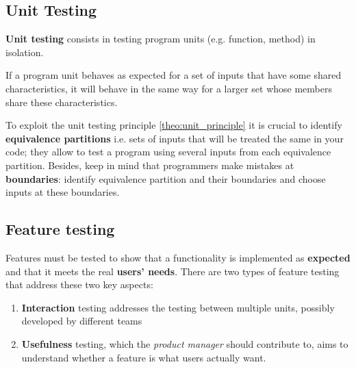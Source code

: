\subsection{Unit Testing}
\textbf{Unit testing} consists in testing program units (e.g. function, method) in isolation.

\begin{theorem}
   \label{theo:unit_principle}
If a program unit behaves as expected for a set of inputs that have some shared
characteristics, it will behave in the same way for a larger set whose members share
these characteristics.

\end{theorem}

To exploit the unit testing principle \ref{theo:unit_principle} it is crucial to
identify \textbf{equivalence partitions} i.e. sets of inputs that will be treated the same in your code;
they allow to test a program using several inputs from each equivalence partition.
Besides, keep in mind that programmers make mistakes at \textbf{boundaries}: 
identify equivalence partition and their boundaries and choose inputs at these boundaries.

\subsection{Feature testing}
Features must be tested to show that a functionality is implemented as \textbf{expected} and that it meets the real \textbf{users' needs}.
There are two types of feature testing that address these two key aspects:
\begin{enumerate}
   \item \textbf{Interaction} testing addresses the testing between multiple units, possibly developed by different teams
   \item \textbf{Usefulness} testing, which the \textit{product manager} should contribute to, aims to understand whether a feature is what users actually want.
\end{enumerate}

